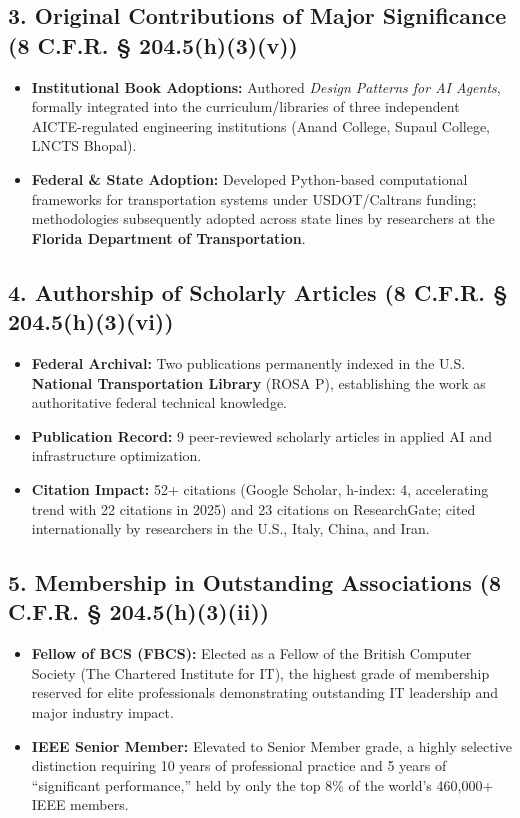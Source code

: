 \documentclass[11pt,a4paper]{article}
\begin{document}
\subsection*{3. Original Contributions of Major Significance (8 C.F.R. § 204.5(h)(3)(v))}
\begin{itemize}
    \item \textbf{Institutional Book Adoptions:} Authored \textit{Design Patterns for AI Agents}, formally integrated into the curriculum/libraries of three independent AICTE-regulated engineering institutions (Anand College, Supaul College, LNCTS Bhopal).
    \item \textbf{Federal \& State Adoption:} Developed Python-based computational frameworks for transportation systems under USDOT/Caltrans funding; methodologies subsequently adopted across state lines by researchers at the \textbf{Florida Department of Transportation}.
\end{itemize}

\subsection*{4. Authorship of Scholarly Articles (8 C.F.R. § 204.5(h)(3)(vi))}
\begin{itemize}
    \item \textbf{Federal Archival:} Two publications permanently indexed in the U.S. \textbf{National Transportation Library} (ROSA P), establishing the work as authoritative federal technical knowledge.
    \item \textbf{Publication Record:} 9 peer-reviewed scholarly articles in applied AI and infrastructure optimization.
    \item \textbf{Citation Impact:} 52+ citations (Google Scholar, h-index: 4, accelerating trend with 22 citations in 2025) and 23 citations on ResearchGate; cited internationally by researchers in the U.S., Italy, China, and Iran.
\end{itemize}

\subsection*{5. Membership in Outstanding Associations (8 C.F.R. § 204.5(h)(3)(ii))}
\begin{itemize}
    \item \textbf{Fellow of BCS (FBCS):} Elected as a Fellow of the British Computer Society (The Chartered Institute for IT), the highest grade of membership reserved for elite professionals demonstrating outstanding IT leadership and major industry impact.
    \item \textbf{IEEE Senior Member:} Elevated to Senior Member grade, a highly selective distinction requiring 10 years of professional practice and 5 years of ``significant performance,'' held by only the top 8\% of the world's 460,000+ IEEE members.
\end{itemize}
\end{document}
